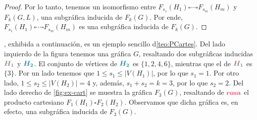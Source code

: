 \begin{proof}
    Por lo tanto, tenemos un isomorfismo entre $F_{s_1}(H_1) \square \cdots
    \square F_{s_m}(H_m)$ y $F_k(G,L)$, una subgr\'afica inducida de $F_k(G)$.
    Por ende, $F_{s_1}(H_1) \square \cdots \square F_{s_m}(H_m)$ es una
    subgr\'afica inducida de $F_k(G)$.
\end{proof}

, exhibida a continuaci\'on, es un ejemplo sencillo
d\cref{teo:PCartes}. Del lado izquierdo de la figura tenemos una gr\'afica $G$,
resaltando dos subgr\'aficas inducidas ${\color{baige}\boldsymbol {H_1}}$ y
${\color{azulMetal}\boldsymbol {H_2}}$. El conjunto de v\'ertices de
${\color{azulMetal}\boldsymbol {H_2}}$ es $\{1,2,4,6\}$, mientras que el de
${\color{baige}\boldsymbol {H_1}}$ es $\{3\}$. Por un lado tenemos que $1\leq
s_1 \leq |V(H_1)|$, por lo que $s_1 =1$. Por otro lado, $1\leq s_2 \leq |V(H_2)|
= 4$ y, adem\'as, $s_1+s_2 = k =3$, por lo que $s_2 =2$. Del lado derecho de
\cref{fig:ex-cart} se muestra la gr\'afica $F_3(G)$, resaltando de
$\color{fushia} \bf rosa$ el producto cartesiano $F_1(H_1) \square F_2(H_2)$.
Observamos que dicha gr\'afica es, en efecto, una subgr\'afica inducida de
$F_3(G)$.

